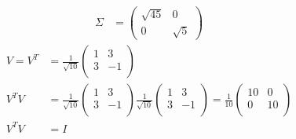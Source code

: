 \documentclass{article}
\begin{document}
\begin{align*}
    \Sigma & =\begin{pmatrix}
        \sqrt{45} & 0 \\0&\sqrt{5}
    \end{pmatrix}
\end{align*}
\begin{align*}
    V =V^T & =\frac{1}{\sqrt{10}}\begin{pmatrix}1 & 3 \\3 & -1\\\end{pmatrix}                                                                                     \\
    V^T V  & =\frac{1}{\sqrt{10}}\begin{pmatrix}1 & 3 \\3 & -1\\\end{pmatrix}\frac{1}{\sqrt{10}}\begin{pmatrix}1 & 3 \\3 & -1\\\end{pmatrix}=\frac{1}{10}\begin{pmatrix}10 & 0 \\0&10\\\end{pmatrix} \\
    V^T V  & =I
\end{align*}
\end{document}
